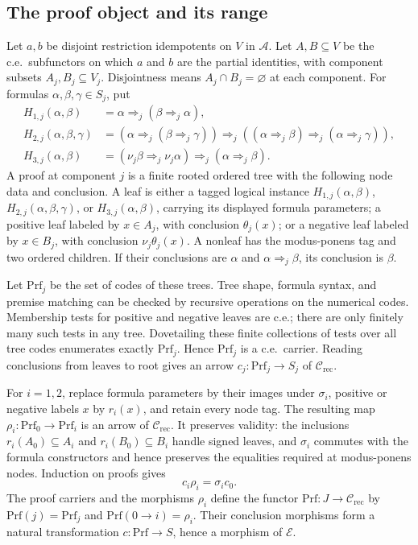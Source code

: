 \documentclass[11pt]{article}
\begin{document}
\subsection{The proof object and its range}

Let $a,b$ be disjoint restriction idempotents on $V$ in $\mathcal A$.
Let $A,B\subseteq V$ be the c.e.\ subfunctors on which
$a$ and $b$ are the partial identities, with component subsets
$A_j,B_j\subseteq V_j$. Disjointness
means $A_j\cap B_j=\varnothing$ at each component.
For formulas $\alpha,\beta,\gamma\in S_j$, put
\begin{align*}
 H_{1,j}(\alpha,\beta)
   &=\alpha\Rightarrow_j(\beta\Rightarrow_j\alpha),\\
 H_{2,j}(\alpha,\beta,\gamma)
   &=(\alpha\Rightarrow_j(\beta\Rightarrow_j\gamma))
     \Rightarrow_j((\alpha\Rightarrow_j\beta)
                          \Rightarrow_j(\alpha\Rightarrow_j\gamma)),\\
 H_{3,j}(\alpha,\beta)
   &=(\nu_j\beta\Rightarrow_j\nu_j\alpha)
                          \Rightarrow_j(\alpha\Rightarrow_j\beta).
\end{align*}
A proof at component $j$ is a finite rooted ordered tree with
the following node data and conclusion. A leaf is either a
tagged logical instance $H_{1,j}(\alpha,\beta)$,
$H_{2,j}(\alpha,\beta,\gamma)$, or
$H_{3,j}(\alpha,\beta)$, carrying its displayed formula
parameters; a positive leaf labeled by $x\in A_j$, with
conclusion $\theta_j(x)$; or a negative leaf labeled by
$x\in B_j$, with conclusion $\nu_j\theta_j(x)$.
A nonleaf has the modus-ponens tag and two ordered children.
If their conclusions are $\alpha$ and
$\alpha\Rightarrow_j\beta$, its conclusion is $\beta$.

Let $\mathrm{Prf}_j$ be the set of codes of these trees.
Tree shape, formula syntax, and premise matching can be checked
by recursive operations on the numerical codes. Membership tests
for positive and negative leaves are c.e.; there are only finitely
many such tests in any tree. Dovetailing these finite collections
of tests over all tree codes enumerates exactly $\mathrm{Prf}_j$.
Hence $\mathrm{Prf}_j$ is a c.e.\ carrier.
Reading conclusions from leaves to root gives an arrow
$c_j:\mathrm{Prf}_j\to S_j$ of $\mathcal C_{\mathrm{rec}}$.

For $i=1,2$, replace formula parameters by their images under
$\sigma_i$, positive or negative labels $x$ by $r_i(x)$, and
retain every node tag. The resulting map
$\rho_i:\mathrm{Prf}_0\to\mathrm{Prf}_i$ is an arrow of
$\mathcal C_{\mathrm{rec}}$.
It preserves validity: the inclusions $r_i(A_0)\subseteq A_i$
and $r_i(B_0)\subseteq B_i$ handle signed leaves, and
$\sigma_i$ commutes with the formula constructors and hence
preserves the equalities required at modus-ponens nodes.
Induction on proofs gives
\[
 c_i\rho_i=\sigma_i c_0.
\]
The proof carriers and the morphisms $\rho_i$ define the functor
$\mathrm{Prf}:J\to\mathcal C_{\mathrm{rec}}$ by
$\mathrm{Prf}(j)=\mathrm{Prf}_j$ and
$\mathrm{Prf}(0\to i)=\rho_i$. Their conclusion morphisms form a
natural transformation $c:\mathrm{Prf}\to S$, hence a morphism of
$\mathcal E$.
\end{document}
